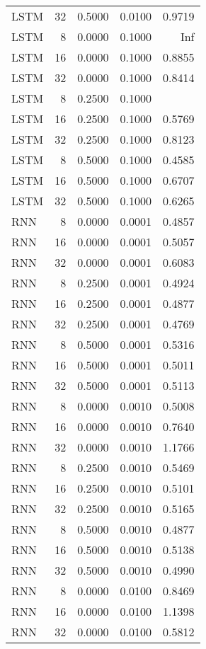 \begin{table}[h!]
\begin{adjustbox}{max width=\textwidth}
\begin{tabular}{lrrrr}
  LSTM &    32 & 0.5000 & 0.0100 & 0.9719 \\ 
  LSTM &     8 & 0.0000 & 0.1000 &   Inf \\ 
  LSTM &    16 & 0.0000 & 0.1000 & 0.8855 \\ 
  LSTM &    32 & 0.0000 & 0.1000 & 0.8414 \\ 
  LSTM &     8 & 0.2500 & 0.1000 &  \\ 
  LSTM &    16 & 0.2500 & 0.1000 & 0.5769 \\ 
  LSTM &    32 & 0.2500 & 0.1000 & 0.8123 \\ 
  LSTM &     8 & 0.5000 & 0.1000 & 0.4585 \\ 
  LSTM &    16 & 0.5000 & 0.1000 & 0.6707 \\ 
  LSTM &    32 & 0.5000 & 0.1000 & 0.6265 \\ 
  RNN &     8 & 0.0000 & 0.0001 & 0.4857 \\ 
  RNN &    16 & 0.0000 & 0.0001 & 0.5057 \\ 
  RNN &    32 & 0.0000 & 0.0001 & 0.6083 \\ 
  RNN &     8 & 0.2500 & 0.0001 & 0.4924 \\ 
  RNN &    16 & 0.2500 & 0.0001 & 0.4877 \\ 
  RNN &    32 & 0.2500 & 0.0001 & 0.4769 \\ 
  RNN &     8 & 0.5000 & 0.0001 & 0.5316 \\ 
  RNN &    16 & 0.5000 & 0.0001 & 0.5011 \\ 
  RNN &    32 & 0.5000 & 0.0001 & 0.5113 \\ 
  RNN &     8 & 0.0000 & 0.0010 & 0.5008 \\ 
  RNN &    16 & 0.0000 & 0.0010 & 0.7640 \\ 
  RNN &    32 & 0.0000 & 0.0010 & 1.1766 \\ 
  RNN &     8 & 0.2500 & 0.0010 & 0.5469 \\ 
  RNN &    16 & 0.2500 & 0.0010 & 0.5101 \\ 
  RNN &    32 & 0.2500 & 0.0010 & 0.5165 \\ 
  RNN &     8 & 0.5000 & 0.0010 & 0.4877 \\ 
  RNN &    16 & 0.5000 & 0.0010 & 0.5138 \\ 
  RNN &    32 & 0.5000 & 0.0010 & 0.4990 \\ 
  RNN &     8 & 0.0000 & 0.0100 & 0.8469 \\ 
  RNN &    16 & 0.0000 & 0.0100 & 1.1398 \\ 
  RNN &    32 & 0.0000 & 0.0100 & 0.5812 \\ 

\end{tabular}
\end{adjustbox}
\end{table}
